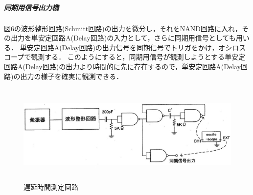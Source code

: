 \documentclass[10pt, a4j, dvipdfmx]{jarticle}
\begin{document}
\subparagraph{同期用信号出力機}
図6の波形整形回路(Schmitt回路)の出力を微分し，それをNAND回路に入れ，その出力を単安定回路A(Delay回路)の入力として，さらに同期用信号としても用いる．
単安定回路A(Delay回路)の出力信号を同期信号でトリガをかけ，オシロスコープで観測する．
このようにすると，同期用信号が観測しようとする単安定回路A(Delay回路)の出力より時間的に先に存在するので，単安定回路A(Delay回路)の出力の様子を確実に観測できる．
\begin{figure}[H]
	\centering
	\includegraphics[width=\hsize, height=50mm]{images/text/fig8.png}
	\caption{遅延時間測定回路}
\end{figure}

\newpage
\end{document}
